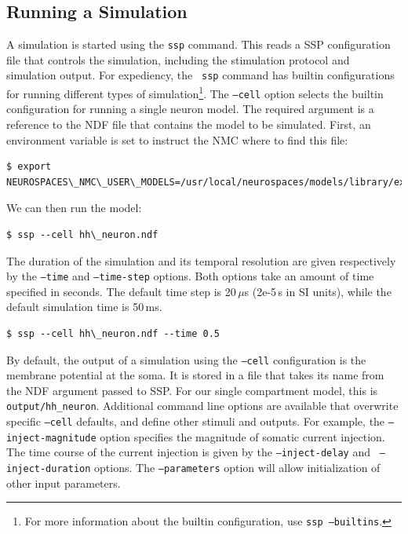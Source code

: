 \documentclass[12pt]{article}
\begin{document}
\subsection{Running a Simulation}
\label{sec:running-simulation}

A simulation is started using the {\tt ssp} command.  This reads a SSP
configuration file that controls the simulation, including the
stimulation protocol and simulation output.  For expediency, the {\tt
  ssp} command has builtin configurations for running different types
of simulation\footnote{For more information about the builtin
  configuration, use {\tt ssp --builtins}.}.  The {\tt --cell}
option selects the builtin configuration for running a single neuron
model.  The required argument is a reference to the NDF file that
contains the model to be simulated.  First, an environment variable is
set to instruct the NMC where to find this file:

\begin{verbatim}
$ export NEUROSPACES\_NMC\_USER\_MODELS=/usr/local/neurospaces/models/library/examples
\end{verbatim}
We can then run the model:
\begin{verbatim}
$ ssp --cell hh\_neuron.ndf
\end{verbatim}

The duration of the simulation and its temporal resolution are given
respectively by the {\tt --time} and {\tt --time-step} options.  Both
options take an amount of time specified in seconds.  The default time
step is 20$\,\mu$s (2e-5$\,$s in SI units), while the default
simulation time is 50$\,$ms.

\begin{verbatim}
$ ssp --cell hh\_neuron.ndf --time 0.5
\end{verbatim}

By default, the output of a simulation using the {\tt --cell}
configuration is the membrane potential at the soma.  It is stored in
a file that takes its name from the NDF argument passed to SSP.  For
our single compartment model, this is {\tt output/hh\_neuron}.
Additional command line options are available that overwrite specific
{\tt --cell} defaults, and define other stimuli and outputs.  For
example, the {\tt --inject-magnitude} option specifies the magnitude
of somatic current injection.  The time course of the current
injection is given by the {\tt --inject-delay} and {\tt
  --inject-duration} options.  The {\tt --parameters} option will
allow initialization of other input parameters.
\end{document}
